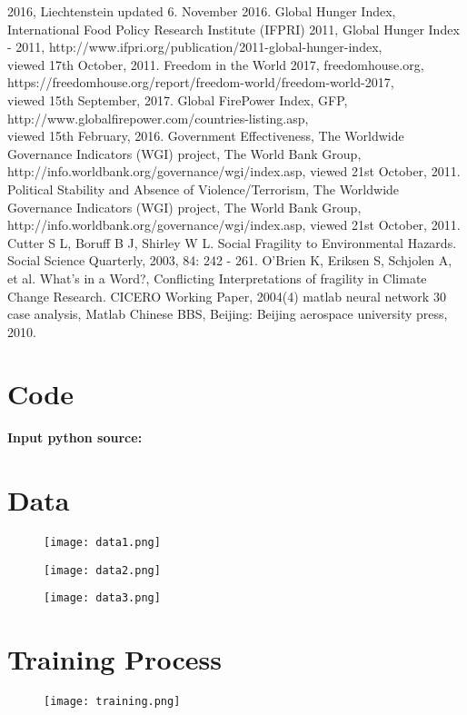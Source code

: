 \documentclass{mcmthesis}
\begin{document}
\begin{thebibliography}{99}
2016, Liechtenstein updated 6. November 2016.
 Global Hunger Index, International Food Policy Research Institute 
(IFPRI) 2011, Global Hunger Index - 2011,
http://www.ifpri.org/publication/2011-global-hunger-index, \\ 
viewed 17th October, 2011.
 Freedom in the World 2017, freedomhouse.org,\\ 
https://freedomhouse.org/report/freedom-world/freedom-world-2017, \\ 
viewed 15th September, 2017.
 Global FirePower Index, GFP,
http://www.globalfirepower.com/countries-listing.asp, \\ 
viewed 15th February, 2016.
 Government Effectiveness, The Worldwide Governance 
Indicators (WGI) project, The World Bank Group, 
http://info.worldbank.org/governance/wgi/index.asp, viewed 21st October, 2011.
 Political Stability and Absence of Violence/Terrorism, 
The Worldwide Governance Indicators (WGI) project, The World Bank Group, \\
http://info.worldbank.org/governance/wgi/index.asp, viewed 21st October, 2011.
 Cutter S L, Boruff B J, Shirley W L. Social 
Fragility to Environmental Hazards. Social Science 
Quarterly, 2003, 84: 242 - 261.
 O’Brien K, Eriksen S, Schjolen A, et al. What’s in a Word?, 
Conflicting Interpretations of fragility in Climate Change Research. CICERO Working Paper, 2004(4)
 matlab neural network 30 case analysis, Matlab Chinese BBS, Beijing: Beijing aerospace university press, 2010.
\end{thebibliography}

\begin{appendices}

\section{Code}

\textbf{\textcolor[rgb]{0.98,0.00,0.00}{Input python source:}}


\section{Data}
\begin{figure}[htbp]
  \centering
  \texttt{[image: data1.png]}
\end{figure}
\begin{figure}[htbp]
  \centering
  \texttt{[image: data2.png]}
\end{figure}
\begin{figure}[htbp]
  \centering
  \texttt{[image: data3.png]}
\end{figure}
\newpage
\section{Training Process}
\begin{figure}[htbp]
  \centering
  \texttt{[image: training.png]}
\end{figure}
\end{appendices}
\end{document}
